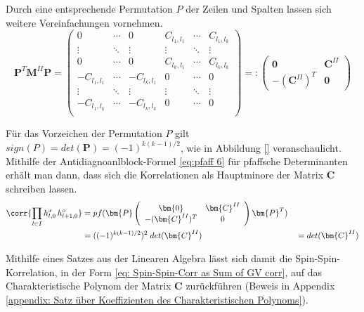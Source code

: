 \noindent Durch eine entsprechende Permutation $P$ der Zeilen und Spalten lassen sich weitere Vereinfachungen vornehmen. 
\begin{equation}
    \bm{P}^T\bm{M}^{II} \bm{P} 
    = \left(\begin{array}{ccccccc} 
      0 & \cdots & 0 & C_{l_1,l_1} & \cdots & C_{l_1,l_k} \\
      \vdots & \ddots & \vdots & \vdots  & \ddots & \vdots \\
      0 & \cdots & 0 & C_{l_k,l_1} & \cdots & C_{l_k,l_k} \\
      -C_{l_1,l_1} & \cdots & -C_{l_k,l_1} & 0 & \cdots & 0   \\
      \vdots & \ddots & \vdots & \vdots  & \ddots & \vdots \\
      -C_{l_1,l_k} & \cdots & -C_{l_k,l_k} & 0 & \cdots & 0   \\
    \end{array}\right) 
    =: \left(\begin{array}{cc}
      \bm{0} & \bm{C}^{II} \\
      -(\bm{C}^{II})^T & \bm{0}
    \end{array}\right) 
\end{equation}

\noindent Für das Vorzeichen der Permutation $P$ gilt $sign(P) = det(\bm{P}) = (-1)^{k(k-1)/2}$, wie in Abbildung \ref{} veranschaulicht. Mithilfe der Antidiagnoanlblock-Formel \eqref{eq:pfaff 6} für pfaffsche Determinanten erhält man dann, dass sich die Korrelationen als Hauptminore der Matrix $\bm{C}$ schreiben lassen.  
\begin{alignat}{2} 
\corr{\prod_{l \in I} h_{l,0}^x\, h_{l+1,0}^o} 
&= pf(\bm{P} \left(\begin{array}{cc}
      \bm{0} & \bm{C}^{II} \\
      -(\bm{C}^{II})^T & 0
    \end{array}\right)  \bm{P}^T) && \nonumber\\
& = ((-1)^{k(k-1)/2})^2 \; det(\bm{C}^{II}) &&= det(\bm{C}^{II}) \label{eq: corr is minor of C}
\end{alignat}

\noindent Mithilfe eines Satzes aus der Linearen Algebra lässt sich damit die Spin-Spin-Korrelation, in der Form \eqref{eq: Spin-Spin-Corr as Sum of GV corr},  auf das Charakteristische Polynom der Matrix $\bm{C}$ zurückführen (Beweis in Appendix \ref{appendix: Satz über Koeffizienten des Charakteristischen Polynoms}).

